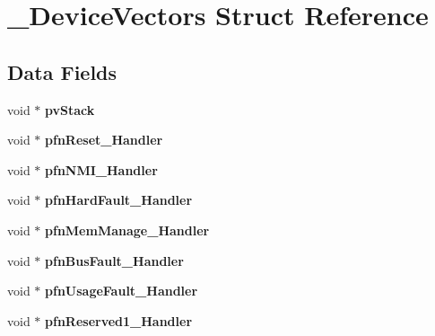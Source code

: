\hypertarget{struct__DeviceVectors}{}\section{\+\_\+\+Device\+Vectors Struct Reference}
\label{struct__DeviceVectors}
\subsection*{Data Fields}
\begin{DoxyCompactItemize}
\item 
\mbox{\label{struct__DeviceVectors_a34a9933af823bbced6d54e5fb75ad26b}} 
void $\ast$ {\bfseries pv\+Stack}
\item 
\mbox{\label{struct__DeviceVectors_a5587d0b64efd410af1a8f60da1535cbb}} 
void $\ast$ {\bfseries pfn\+Reset\+\_\+\+Handler}
\item 
\mbox{\label{struct__DeviceVectors_a10ea32f56b865adc32317cebc34b3ad9}} 
void $\ast$ {\bfseries pfn\+N\+M\+I\+\_\+\+Handler}
\item 
\mbox{\label{struct__DeviceVectors_a1a4fd6f9de88fb67ee3a56d76f39ec93}} 
void $\ast$ {\bfseries pfn\+Hard\+Fault\+\_\+\+Handler}
\item 
\mbox{\label{struct__DeviceVectors_a30093f5487fb72e951122c8fc4977bda}} 
void $\ast$ {\bfseries pfn\+Mem\+Manage\+\_\+\+Handler}
\item 
\mbox{\label{struct__DeviceVectors_afdd874523e6a53a880cef222661bd158}} 
void $\ast$ {\bfseries pfn\+Bus\+Fault\+\_\+\+Handler}
\item 
\mbox{\label{struct__DeviceVectors_ac787630b4d00bd0967868a3908a62571}} 
void $\ast$ {\bfseries pfn\+Usage\+Fault\+\_\+\+Handler}
\item 
\mbox{\label{struct__DeviceVectors_a34f451bdee9d00aced9b99b95f7dead4}} 
void $\ast$ {\bfseries pfn\+Reserved1\+\_\+\+Handler}
\item 
\mbox{\label{struct__DeviceVectors_af94fbcffa6c9a23e5f606d0f4721ea1d}} 

\end{DoxyCompactItemize}

